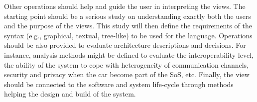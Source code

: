 Other operations should help and guide the user in interpreting the views. The starting point should be a serious study on understanding exactly both the users and the purpose of the views. This study will then define the requirements of the syntax (e.g., graphical, textual, tree-like) to be used for the language. 
Operations should be also provided to evaluate architecture descriptions and decisions. For instance, analysis methods might be defined to evaluate the interoperability level, the ability of the system to cope with heterogeneity of communication channels, security and privacy when the car become part of the SoS, etc.
Finally, the view should be connected to the software and system life-cycle through methods helping the design and build of the system.

%
%
%
%
%
%

